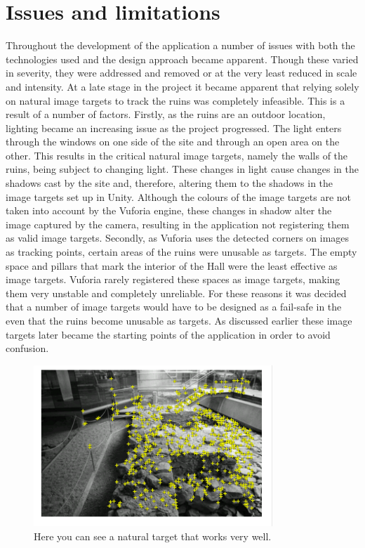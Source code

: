 \section{Issues and limitations}
Throughout the development of the application a number of issues with both the technologies used and the design approach became apparent. Though these varied in severity, they were addressed and removed or at the very least reduced in scale and intensity.
At a late stage in the project it became apparent that relying solely on natural image targets to track the ruins was completely infeasible. This is a result of a number of factors.
Firstly, as the ruins are an outdoor location, lighting became an increasing issue as the project progressed. The light enters through the windows on one side of the site and through an open area on the other. This results in the critical natural image targets, namely the walls of the ruins, being subject to changing light. These changes in light cause changes in the shadows cast by the site and, therefore, altering them to the shadows in the image targets set up in Unity. Although the colours of the image targets are not taken into account by the Vuforia engine, these changes in shadow alter the image captured by the camera, resulting in the application not registering them as valid image targets.
Secondly, as Vuforia uses the detected corners on images as tracking points, certain areas of the ruins were unusable as targets. The empty space and pillars that mark the interior of the Hall were the least effective as image targets. Vuforia rarely registered these spaces as image targets, making them very unstable and completely unreliable. For these reasons it was decided that a number of image targets would have to be designed as a fail-safe in the even that the ruins become unusable as targets.
As discussed earlier these image targets later became the starting points of the application in order to avoid confusion.

\begin{figure}[ht!]
	\centering
	\includegraphics[width=90mm]{goodTarget}
	\caption{Here you can see a natural target that works very well.
		\label{overflow}}
\end{figure}


